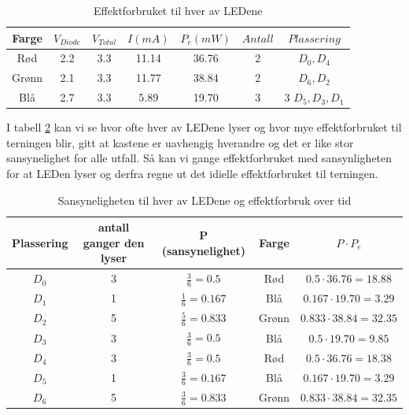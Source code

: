 \begin{table}[!h]
  \centering
  \caption{Effektforbruket til hver av LEDene}
  \begin{tabular}[!h]{ |c|c|c|c|c|c|c| }
    \hline
    Farge &  $V_{Diode}$ & $V_{Total}$ & $I(mA)$ & $P_e(mW)$ & $Antall$ & $Plassering$ \\
    \hline
    Rød & 2.2 & 3.3 & 11.14 & 36.76 & 2 & $D_0, D_4$ \\
    \hline
    Grønn & 2.1 & 3.3 & 11.77 & 38.84 & 2 & $D_6, D_2$ \\
    \hline
    Blå & 2.7 & 3.3 & 5.89 & 19.70 & 3 & 3 $D_5, D_3, D_1$\\
    \hline
  \end{tabular}
  \label{table:tab3}
\end{table}

I tabell \ref{table:tab4} kan vi se hvor ofte hver av LEDene lyser og hvor mye effektforbruket til terningen blir, gitt at kastene er uavhengig hverandre og det er like stor sansynelighet for alle utfall. Så kan vi gange effektforbruket med sansynligheten for at LEDen lyser og derfra regne ut det idielle effektforbruket til terningen.



\begin{table}[!h]
  \centering
  \caption{Sansyneligheten til hver av LEDene og effektforbruk over tid}
  \begin{tabular}[!h]{ |c|c|c|c|c| } 
    \hline
    Plassering & antall ganger den lyser & P (sansynelighet) & Farge & $P \cdot P_e$  \\
    \hline
    $D_0$ & 3 & $\frac{3}{6} = 0.5$ & Rød & $0.5 \cdot 36.76 = 18.88$\\
    \hline
    $D_1$ & 1 & $\frac{1}{6} = 0.167$ & Blå & $0.167 \cdot 19.70 = 3.29$\\
    \hline
    $D_2$ & 5 & $\frac{5}{6} = 0.833$ & Grønn & $0.833 \cdot 38.84 = 32.35$\\
    \hline
    $D_3$ & 3 & $\frac{3}{6} = 0.5$ & Blå & $0.5 \cdot 19.70 = 9.85$\\
    \hline
    $D_4$ & 3 & $\frac{3}{6} = 0.5$ & Rød & $0.5 \cdot 36.76 = 18.38$\\
    \hline
    $D_5$ & 1 & $\frac{3}{6} = 0.167$ & Blå & $0.167 \cdot 19.70 = 3.29$\\
    \hline
    $D_6$ & 5 & $\frac{3}{6} = 0.833$ & Grønn & $0.833 \cdot 38.84 = 32.35$\\
    \hline
  \end{tabular}
  
  \label{table:tab4}
\end{table}

